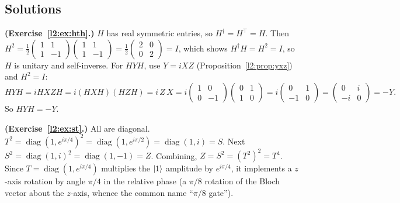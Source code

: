 \subsection*{Solutions}

\begin{solution}
\textbf{(Exercise~\ref{l2:ex:hth}.)} $H$ has real symmetric entries, so
$H^{\dagger}=H^{\top}=H$. Then
$H^{2}=\tfrac12\left(\begin{smallmatrix}1&1\\1&-1\end{smallmatrix}\right)
\left(\begin{smallmatrix}1&1\\1&-1\end{smallmatrix}\right)
=\tfrac12\left(\begin{smallmatrix}2&0\\0&2\end{smallmatrix}\right)=I$, which shows
$H^{\dagger}H=H^{2}=I$, so $H$ is unitary and self-inverse. For $HYH$, use
$Y=iXZ$ (Proposition~\ref{l2:prop:yxz}) and $H^{2}=I$:
\[
  HYH=iH X Z H = i(HXH)(HZH)=i\,Z\,X
     = i\begin{pmatrix}1&0\\0&-1\end{pmatrix}
       \begin{pmatrix}0&1\\1&0\end{pmatrix}
     = i\begin{pmatrix}0&1\\-1&0\end{pmatrix}
     = \begin{pmatrix}0&i\\-i&0\end{pmatrix}=-Y.
\]
So $HYH=-Y$.
\end{solution}

\begin{solution}
\textbf{(Exercise~\ref{l2:ex:st}.)} All are diagonal. $T^{2}
=\operatorname{diag}(1,e^{i\pi/4})^{2}=\operatorname{diag}(1,e^{i\pi/2})
=\operatorname{diag}(1,i)=S$. Next $S^{2}=\operatorname{diag}(1,i)^{2}
=\operatorname{diag}(1,-1)=Z$. Combining, $Z=S^{2}=(T^{2})^{2}=T^{4}$. Since
$T=\operatorname{diag}(1,e^{i\pi/4})$ multiplies the $\ket{1}$ amplitude by
$e^{i\pi/4}$, it implements a $z$-axis rotation by angle $\pi/4$ in the relative
phase (a $\pi/8$ rotation of the Bloch vector about the $z$-axis, whence the
common name ``$\pi/8$ gate'').
\end{solution}

